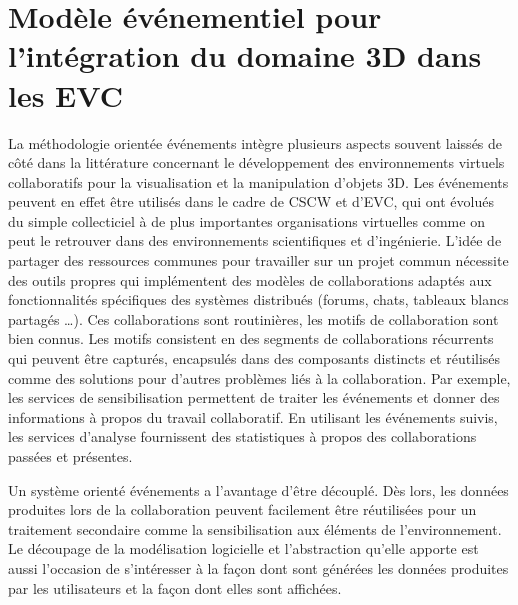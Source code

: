 
\section{Modèle événementiel pour l'intégration du domaine 3D dans les 
EVC}

La méthodologie orientée événements intègre plusieurs aspects souvent laissés 
de côté dans la littérature concernant le développement des environnements 
virtuels collaboratifs pour la visualisation et la manipulation d'objets 3D. 
Les événements peuvent en effet être utilisés dans le cadre de \gls{CSCW} et 
d'\gls{EVC}, qui ont évolués du simple collecticiel à de plus importantes 
organisations virtuelles comme on peut le retrouver dans des environnements 
scientifiques et d'ingénierie. L'idée de partager des ressources communes pour 
travailler sur un projet commun nécessite des outils propres qui implémentent 
des modèles de collaborations adaptés aux fonctionnalités spécifiques des 
systèmes distribués (forums, chats, tableaux blancs partagés \dots). Ces 
collaborations sont routinières, les motifs de collaboration sont bien connus. Les 
motifs consistent en des segments de collaborations récurrents qui peuvent être 
capturés, encapsulés dans des composants distincts et réutilisés comme des 
solutions pour d'autres problèmes liés à la collaboration. Par exemple, les services 
de sensibilisation permettent de traiter les événements et donner des informations 
à propos du travail collaboratif. En utilisant les événements suivis, les services 
d'analyse fournissent des statistiques à propos des collaborations passées et 
présentes.


Un système orienté événements a l'avantage d'être découplé. Dès 
lors, les données produites lors de la collaboration peuvent facilement être 
réutilisées pour un traitement secondaire comme la sensibilisation aux éléments 
de l'environnement. 
Le découpage de la modélisation logicielle et l'abstraction qu'elle apporte est aussi 
l'occasion de s'intéresser à la façon dont sont générées les données produites par 
les utilisateurs et la façon dont elles sont affichées. 

